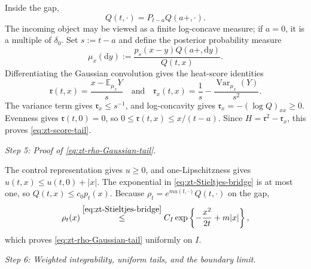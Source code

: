 \documentclass[10pt]{amsart}
\theoremstyle{definition}
\theoremstyle{remark}
\numberwithin{equation}{section}
\newcommand{\E}{\mathbb E}
\newcommand{\1}{\mathbf 1}
\newcommand{\Var}{\operatorname{Var}}
\newcommand{\stackref}[2]{\stackrel{#2}{#1}}
\begin{document}
Inside the gap,
\begin{equation*}
 Q(t,\cdot)=P_{t-a}Q(a+,\cdot).
\end{equation*}
The incoming object may be viewed as a finite log-concave measure; if $a=0$, it is a multiple of $\delta_0$.  Set $s:=t-a$ and define the posterior probability measure
\begin{equation*}
 \mu_x(\mathrm d y):=\frac{p_s(x-y)Q(a+,\mathrm d y)}{Q(t,x)}.
\end{equation*}
Differentiating the Gaussian convolution gives the heat-score identities
\begin{equation*}
 \mathfrak r(t,x)=\frac{x-\E_{\mu_x}Y}{s}
 \quad\text{and}\quad
 \mathfrak r_x(t,x)=\frac1s-\frac{\Var_{\mu_x}(Y)}{s^2}.
\end{equation*}
The variance term gives $\mathfrak r_x\leq s^{-1}$, and log-concavity gives $\mathfrak r_x=-(\log Q)_{xx}\geq0$.  Evenness gives $\mathfrak r(t,0)=0$, so $0\leq\mathfrak r(t,x)\leq x/(t-a)$.  Since $H=\mathfrak r^2-\mathfrak r_x$, this proves \eqref{eq:zt-score-tail}.

\smallskip
\noindent\emph{Step 5: Proof of \eqref{eq:zt-rho-Gaussian-tail}.}

The control representation gives $u\geq0$, and one-Lipschitzness gives $u(t,x)\leq u(t,0)+|x|$.  The exponential in \eqref{eq:zt-Stieltjes-bridge} is at most one, so $Q(t,x)\leq c_0p_t(x)$.  Because $\rho_t=e^{mu(t,\cdot)}Q(t,\cdot)$ on the gap,
\begin{equation*}
 \rho_t(x)
 \stackref{\leq}{\eqref{eq:zt-Stieltjes-bridge}}
 C_I\exp\left\{-\frac{x^2}{2t}+m|x|\right\},
\end{equation*}
which proves \eqref{eq:zt-rho-Gaussian-tail} uniformly on $I$.

\smallskip
\noindent\emph{Step 6: Weighted integrability, uniform tails, and the boundary limit.}
\end{document}
